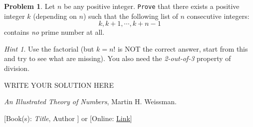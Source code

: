 \documentclass[11pt]{article}
\theoremstyle{plain}
\theoremstyle{definition}
\newtheorem{problem}{Problem}
\theoremstyle{remark}
\newtheorem*{hint}{Hint}
\numberwithin{equation}{problem}
\begin{document}
\begin{problem}
	Let $n$ be any positive integer. \texttt{Prove} that there exists a positive integer $k$ (depending on $n$) such that the following list of $n$ consecutive integers:
	\[
		k, k + 1, \cdots, k + n - 1
	\]
	contains \emph{no} prime number at all.
	\begin{hint}
		Use the factorial (but $k=n!$ is NOT the correct answer, start from this and try to see what are missing). You also need the \emph{2-out-of-3} property of division.
	\end{hint}
\end{problem}
\begin{solution} %
WRITE YOUR SOLUTION HERE
\end{solution}\clearpage %




\begin{thebibliography}{9}  %
\emph{An Illustrated Theory of Numbers}, Martin H. Weissman.

[Book(s): \emph{Title}, Author ] or [Online: \href{http://example.com/}{Link}]
\end{thebibliography}  %
\end{document}
